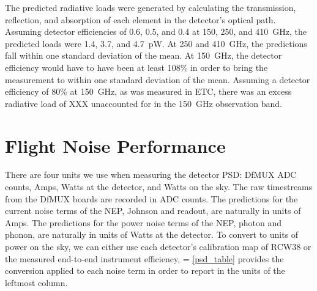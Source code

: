 The predicted radiative loads were generated by calculating the transmission, reflection, and absorption of each element in the detector's optical path. 
Assuming detector efficiencies of 0.6, 0.5, and 0.4 at 150, 250, and 410~GHz, the predicted loads were 1.4, 3.7, and 4.7~pW.
At 250 and 410~GHz, the predictions fall within one standard deviation of the mean. 
At 150~GHz, the detector efficiency would have to have been at least 108\% in order to bring the measurement to within one standard deviation of the mean. 
Assuming a detector efficiency of 80\% at 150~GHz, as was measured in \ac{ETC}, there was an excess radiative load of XXX unaccounted for in the 150~GHz observation band. 




\section{Flight Noise Performance}
\label{sec:flight_noise_performance}

There are four units we use when measuring the detector \ac{PSD}: \ac{DfMUX} \ac{ADC} counts, Amps, Watts at the detector, and Watts on the sky. 
The raw timestreams from the \ac{DfMUX} boards are recorded in \ac{ADC} counts. 
The predictions for the current noise terms of the \ac{NEP}, Johnson and readout, are naturally in units of Amps.
The predictions for the power noise terms of the \ac{NEP}, photon and phonon, are naturally in units of Watts at the detector. 
To convert to units of power on the sky, we can either use each detector's calibration map of RCW38 or the measured end-to-end instrument efficiency, 
\be
\varepsilon = 
\label{eq:eff_ratio}
\ee
\TAB\ref{psd_table} provides the conversion applied to each noise term in order to report in the units of the leftmost column. 

